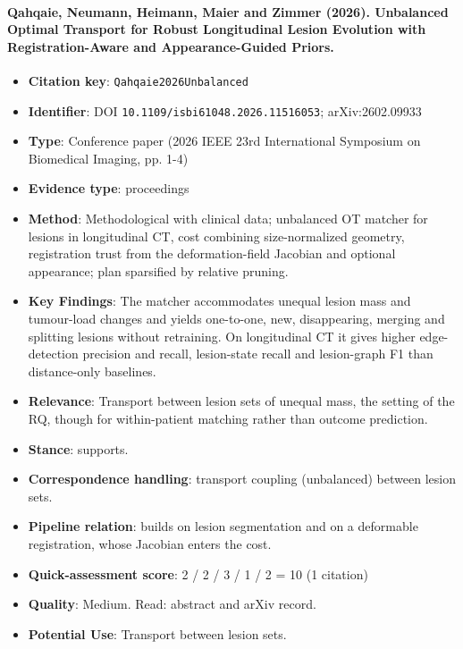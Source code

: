 \documentclass[journal,onecolumn]{IEEEtran}
\begin{document}
\paragraph{Qahqaie, Neumann, Heimann, Maier and Zimmer (2026). Unbalanced Optimal Transport for Robust Longitudinal Lesion Evolution with Registration-Aware and Appearance-Guided Priors.~\cite{Qahqaie2026Unbalanced}}\mbox{}

\begin{itemize}

\item{} \textbf{Citation key}: \texttt{Qahqaie2026Unbalanced}

\item{} \textbf{Identifier}: DOI \nolinkurl{10.1109/isbi61048.2026.11516053}; arXiv:2602.09933

\item{} \textbf{Type}: Conference paper (2026 IEEE 23rd International Symposium on Biomedical Imaging, pp. 1-4)

\item{} \textbf{Evidence type}: proceedings

\item{} \textbf{Method}: Methodological with clinical data; unbalanced OT matcher for lesions in longitudinal CT, cost combining size-normalized geometry, registration trust from the deformation-field Jacobian and optional appearance; plan sparsified by relative pruning.

\item{} \textbf{Key Findings}: The matcher accommodates unequal lesion mass and tumour-load changes and yields one-to-one, new, disappearing, merging and splitting lesions without retraining. On longitudinal CT it gives higher edge-detection precision and recall, lesion-state recall and lesion-graph F1 than distance-only baselines.

\item{} \textbf{Relevance}: Transport between lesion sets of unequal mass, the setting of the RQ, though for within-patient matching rather than outcome prediction.

\item{} \textbf{Stance}: supports.

\item{} \textbf{Correspondence handling}: transport coupling (unbalanced) between lesion sets.

\item{} \textbf{Pipeline relation}: builds on lesion segmentation and on a deformable registration, whose Jacobian enters the cost.

\item{} \textbf{Quick-assessment score}: 2 / 2 / 3 / 1 / 2 = 10 (1 citation)

\item{} \textbf{Quality}: Medium. Read: abstract and arXiv record.

\item{} \textbf{Potential Use}: Transport between lesion sets.

\end{itemize}
\end{document}
